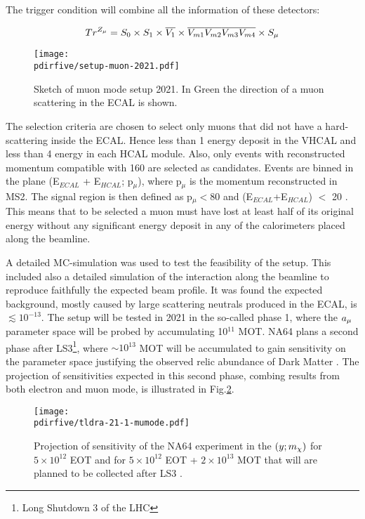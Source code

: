 The trigger condition will combine all the information of these detectors:

\begin{equation}
\label{eq:trigger-mumode}
Tr^{Z_{\mu}} = S_0 \times S_1 \times \overline{V_1} \times \overline{V_{m1}}\overline{V_{m2}}\overline{V_{m3}}\overline{V_{m4}}\times S_{\mu}
\end{equation}

\begin{figure}[bth!]
  \centering
  \texttt{[image: \\pdirfive/setup-muon-2021.pdf]}
  \caption[Sketch of muon mode setup 2021]{Sketch of muon mode setup 2021. In Green the direction of a muon scattering in the ECAL is shown.}
  \label{fig:muon-mode-setup}
\end{figure}

The selection criteria are chosen to select only muons that did not have a hard-scattering inside the ECAL. Hence less than 1 \gev energy deposit in the VHCAL and less than 4 \gev energy in each HCAL module. Also, only events with reconstructed momentum compatible with 160 \gev are selected as candidates. Events are binned in the plane (E$_{ECAL}$ + E$_{HCAL}$; p$_{\mu}$), where p$_{\mu}$ is the momentum reconstructed in MS2. The signal region is then defined as p$_{\mu} <$80 \gev and (E$_{ECAL}$+E$_{HCAL}$) $<$ 20 \gev. This means that to be selected a muon must have lost at least half of its original energy without any significant energy deposit in any of the calorimeters placed along the beamline.

A detailed MC-simulation was used to test the feasibility of the setup. This included also a detailed simulation of the interaction along the beamline to reproduce faithfully the expected beam profile. It was found the expected background, mostly caused by large scattering neutrals produced in the ECAL, is $\lesssim 10^{-13}$. The setup will be tested in 2021 in the so-called phase 1, where the $a_{\mu}$ parameter space will be probed by accumulating 10$^{11}$ MOT. NA64 plans a second phase after LS3\footnote{Long Shutdown 3 of the LHC}, where $\sim 10^{13}$ MOT will be accumulated to gain sensitivity on the parameter space justifying the observed relic abundance of Dark Matter \cite{Gninenko:2640930}. The projection of sensitivities expected in this second phase, combing results from both electron and muon mode, is illustrated in Fig.\ref{fig:dmyplane-mumode}.

\begin{figure}[bth!]
  \centering
  \texttt{[image: \\pdirfive/tldra-21-1-mumode.pdf]}
  \caption[sensitivity projection for invisible mode + muon mode 2021]{Projection of sensitivity of the NA64 experiment in the $(y;m_{\chi})$ for $5 \times 10^{12}$ EOT and for $5 \times 10^{12}$ EOT + $2 \times 10^{13}$ MOT that will are planned to be collected after LS3 \cite{Gninenko:2019qiv}.}
  \label{fig:dmyplane-mumode}
\end{figure}



